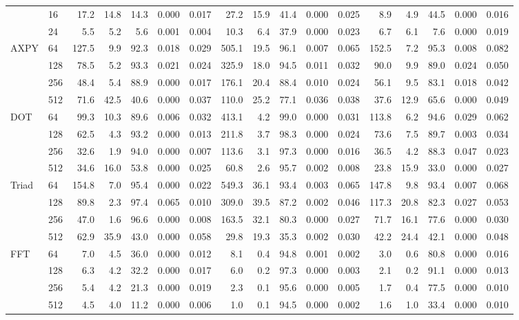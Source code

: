 \begin{table}[htbp]
\begin{tabular}{llrrrrrrrrrrrrrrr}
 & 16 & 17.2 & 14.8 & 14.3 & 0.000 & 0.017 & 27.2 & 15.9 & 41.4 & 0.000 & 0.025 & 8.9 & 4.9 & 44.5 & 0.000 & 0.016 \\
 & 24 & 5.5 & 5.2 & 5.6 & 0.001 & 0.004 & 10.3 & 6.4 & 37.9 & 0.000 & 0.023 & 6.7 & 6.1 & 7.6 & 0.000 & 0.019 \\
\midrule
\multirow{4}{*}{AXPY} & 64 & 127.5 & 9.9 & 92.3 & 0.018 & 0.029 & 505.1 & 19.5 & 96.1 & 0.007 & 0.065 & 152.5 & 7.2 & 95.3 & 0.008 & 0.082 \\
 & 128 & 78.5 & 5.2 & 93.3 & 0.021 & 0.024 & 325.9 & 18.0 & 94.5 & 0.011 & 0.032 & 90.0 & 9.9 & 89.0 & 0.024 & 0.050 \\
 & 256 & 48.4 & 5.4 & 88.9 & 0.000 & 0.017 & 176.1 & 20.4 & 88.4 & 0.010 & 0.024 & 56.1 & 9.5 & 83.1 & 0.018 & 0.042 \\
 & 512 & 71.6 & 42.5 & 40.6 & 0.000 & 0.037 & 110.0 & 25.2 & 77.1 & 0.036 & 0.038 & 37.6 & 12.9 & 65.6 & 0.000 & 0.049 \\
\midrule
\multirow{4}{*}{DOT} & 64 & 99.3 & 10.3 & 89.6 & 0.006 & 0.032 & 413.1 & 4.2 & 99.0 & 0.000 & 0.031 & 113.8 & 6.2 & 94.6 & 0.029 & 0.062 \\
 & 128 & 62.5 & 4.3 & 93.2 & 0.000 & 0.013 & 211.8 & 3.7 & 98.3 & 0.000 & 0.024 & 73.6 & 7.5 & 89.7 & 0.003 & 0.034 \\
 & 256 & 32.6 & 1.9 & 94.0 & 0.000 & 0.007 & 113.6 & 3.1 & 97.3 & 0.000 & 0.016 & 36.5 & 4.2 & 88.3 & 0.047 & 0.023 \\
 & 512 & 34.6 & 16.0 & 53.8 & 0.000 & 0.025 & 60.8 & 2.6 & 95.7 & 0.002 & 0.008 & 23.8 & 15.9 & 33.0 & 0.000 & 0.027 \\
\midrule
\multirow{4}{*}{Triad} & 64 & 154.8 & 7.0 & 95.4 & 0.000 & 0.022 & 549.3 & 36.1 & 93.4 & 0.003 & 0.065 & 147.8 & 9.8 & 93.4 & 0.007 & 0.068 \\
 & 128 & 89.8 & 2.3 & 97.4 & 0.065 & 0.010 & 309.0 & 39.5 & 87.2 & 0.002 & 0.046 & 117.3 & 20.8 & 82.3 & 0.027 & 0.053 \\
 & 256 & 47.0 & 1.6 & 96.6 & 0.000 & 0.008 & 163.5 & 32.1 & 80.3 & 0.000 & 0.027 & 71.7 & 16.1 & 77.6 & 0.000 & 0.030 \\
 & 512 & 62.9 & 35.9 & 43.0 & 0.000 & 0.058 & 29.8 & 19.3 & 35.3 & 0.002 & 0.030 & 42.2 & 24.4 & 42.1 & 0.000 & 0.048 \\
\midrule
\multirow{4}{*}{FFT} & 64 & 7.0 & 4.5 & 36.0 & 0.000 & 0.012 & 8.1 & 0.4 & 94.8 & 0.001 & 0.002 & 3.0 & 0.6 & 80.8 & 0.000 & 0.016 \\
 & 128 & 6.3 & 4.2 & 32.2 & 0.000 & 0.017 & 6.0 & 0.2 & 97.3 & 0.000 & 0.003 & 2.1 & 0.2 & 91.1 & 0.000 & 0.013 \\
 & 256 & 5.4 & 4.2 & 21.3 & 0.000 & 0.019 & 2.3 & 0.1 & 95.6 & 0.000 & 0.005 & 1.7 & 0.4 & 77.5 & 0.000 & 0.010 \\
 & 512 & 4.5 & 4.0 & 11.2 & 0.000 & 0.006 & 1.0 & 0.1 & 94.5 & 0.000 & 0.002 & 1.6 & 1.0 & 33.4 & 0.000 & 0.010 \\
\bottomrule
\end{tabular}
\end{table}